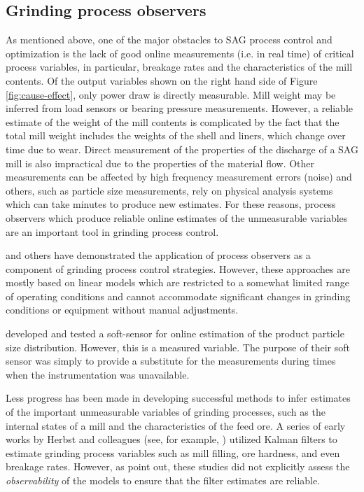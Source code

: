 \subsection{Grinding process observers}

As mentioned above, one of the major obstacles to SAG process control and optimization is the lack of good online measurements (i.e. in real time) of critical process variables, in particular, breakage rates and the characteristics of the mill contents. Of the output variables shown on the right hand side of Figure \ref{fig:cause-effect}, only power draw is directly measurable. Mill weight may be inferred from load sensors or bearing pressure measurements. However, a reliable estimate of the weight of the mill contents is complicated by the fact that the total mill weight includes the weights of the shell and liners, which change over time due to wear. Direct measurement of the properties of the discharge of a SAG mill is also impractical due to the properties of the material flow.  Other measurements can be affected by high frequency measurement errors (noise) and others, such as particle size measurements, rely on physical analysis systems which can take minutes to produce new estimates. For these reasons, process observers which produce reliable online estimates of the unmeasurable variables are an important tool in grinding process control.

\cite{le_roux_throughput_2016} and others have demonstrated the application of process observers as a component of grinding process control strategies. However, these approaches are mostly based on linear models which are restricted to a somewhat limited range of operating conditions and cannot accommodate significant changes in grinding conditions or equipment without manual adjustments.

\cite{casali_particle_1998} developed and tested a soft-sensor for online estimation of the product particle size distribution. However, this is a measured variable. The purpose of their soft sensor was simply to provide a substitute for the measurements during times when the instrumentation was unavailable. 

Less progress has been made in developing successful methods to infer estimates of the important unmeasurable variables of grinding processes, such as the internal states of a mill and the characteristics of the feed ore. A series of early works by Herbst and colleagues (see, for example, \cite{herbst_model-based_1992}) utilized Kalman filters to estimate grinding process variables such as mill filling, ore hardness, and even breakage rates. However, as \cite{le_roux_ekf_2017} point out, these studies did not explicitly assess the \textit{observability} of the models to ensure that the filter estimates are reliable.

